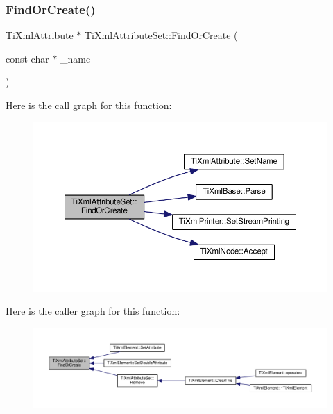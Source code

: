 \subsubsection{\texorpdfstring{Find\+Or\+Create()}{FindOrCreate()}}
{\footnotesize\ttfamily \hyperlink{class_ti_xml_attribute}{Ti\+Xml\+Attribute} $\ast$ Ti\+Xml\+Attribute\+Set\+::\+Find\+Or\+Create (\begin{DoxyParamCaption}\item[{const char $\ast$}]{\+\_\+name }\end{DoxyParamCaption})}

Here is the call graph for this function\+:
\nopagebreak
\begin{figure}[H]
\begin{center}
\leavevmode
\includegraphics[width=350pt]{class_ti_xml_attribute_set_a5e28f5d32f048fba85d04dc317495bdc_cgraph}
\end{center}
\end{figure}
Here is the caller graph for this function\+:
\nopagebreak
\begin{figure}[H]
\begin{center}
\leavevmode
\includegraphics[width=350pt]{class_ti_xml_attribute_set_a5e28f5d32f048fba85d04dc317495bdc_icgraph}
\end{center}
\end{figure}
\mbox{\label{class_ti_xml_attribute_set_a85dfd2b5bae45c94334dced146f5c11a}} 
